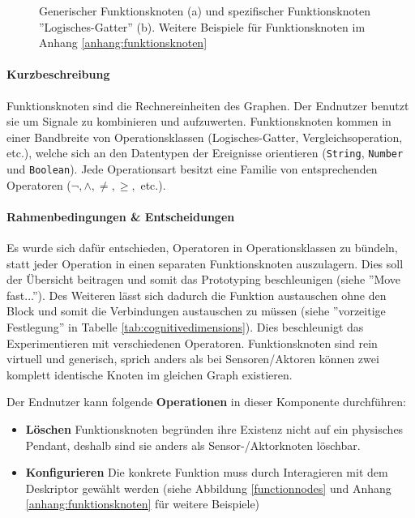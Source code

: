 \begin{figure}[h]
\begin{subfigure}{.5\textwidth}
  \caption{}
  \label{fig:functionnodesgate}
\end{subfigure}
    \caption{Generischer Funktionsknoten (a) und spezifischer Funktionsknoten ''Logisches-Gatter'' (b). Weitere Beispiele für Funktionsknoten im Anhang \ref{anhang:funktionsknoten}}
    \label{fig:functionnodes}
\end{figure}

\paragraph{Kurzbeschreibung} Funktionsknoten sind die Rechnereinheiten des Graphen. Der Endnutzer benutzt sie um Signale zu kombinieren und aufzuwerten. Funktionsknoten kommen in einer Bandbreite von Operationsklassen (Logisches-Gatter, Vergleichsoperation, etc.), welche sich an den Datentypen der Ereignisse orientieren (\texttt{String}, \texttt{Number} und \texttt{Boolean}). Jede Operationsart besitzt eine Familie von entsprechenden Operatoren ($\neg, \land,\neq,\geq,$ etc.).

\paragraph{Rahmenbedingungen \& Entscheidungen} Es wurde sich dafür entschieden, Operatoren in Operationsklassen zu bündeln, statt jeder Operation in einen separaten Funktionsknoten auszulagern. Dies soll der Übersicht beitragen und somit das Prototyping beschleunigen (siehe ''Move fast...''). Des Weiteren lässt sich dadurch die Funktion austauschen ohne den Block und somit die Verbindungen austauschen zu müssen (siehe ''vorzeitige Festlegung'' in Tabelle \ref{tab:cognitivedimensions}). Dies beschleunigt das Experimentieren mit verschiedenen Operatoren. Funktionsknoten sind rein virtuell und generisch, sprich anders als bei Sensoren/Aktoren können zwei komplett identische Knoten im gleichen Graph existieren.

Der Endnutzer kann folgende \textbf{Operationen} in dieser Komponente durchführen: 
\begin{itemize}
    \item \textbf{Löschen} Funktionsknoten begründen ihre Existenz nicht auf ein physisches Pendant, deshalb sind sie anders als Sensor-/Aktorknoten löschbar.
    \item \textbf{Konfigurieren} Die konkrete Funktion muss durch Interagieren mit dem Deskriptor gewählt werden (siehe Abbildung \ref{functionnodes} und Anhang \ref{anhang:funktionsknoten} für weitere Beispiele)
\end{itemize}

